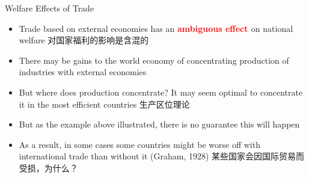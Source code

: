 \documentclass[10pt,hyperref={CJKbookmarks=true},xcolor=dvipsnames,aspectratio=169]{beamer}
\begin{document}
\begin{frame}{Welfare Effects of Trade}

\begin{itemize}
\item Trade based on external economies has an \textbf{\textcolor{red}{ambiguous
effect }}on national welfare 对国家福利的影响是含混的
\item There may be gains to the world economy of concentrating production
of industries with external economies 
\item But where does production concentrate? It may seem optimal to concentrate
it in the most efficient countries 生产区位理论
\item But as the example above illustrated, there is no guarantee this will
happen 
\item As a result, in some cases some countries might be worse off with
international trade than without it (Graham, 1928) 某些国家会因国际贸易而受损，为什么？
\end{itemize}
\end{frame}
\end{document}
